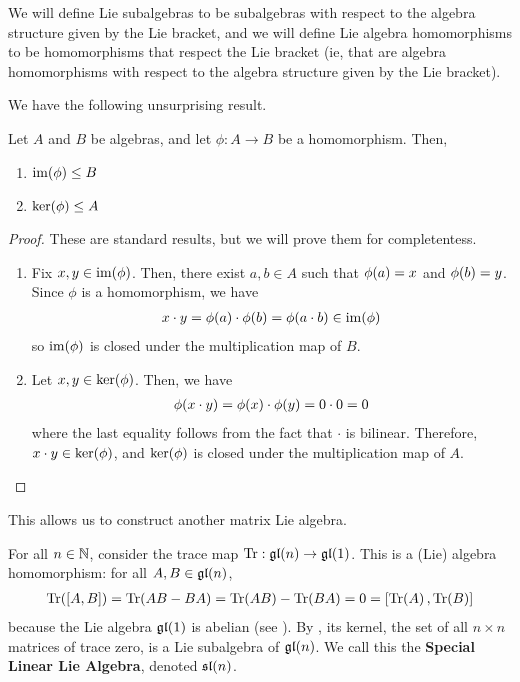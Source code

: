 \begin{boxconvention}
    We will define Lie subalgebras to be subalgebras with respect to the algebra structure given by the Lie bracket, and we will define Lie algebra homomorphisms to be homomorphisms that respect the Lie bracket (ie, that are algebra homomorphisms with respect to the algebra structure given by the Lie bracket).
\end{boxconvention}

We have the following unsurprising result.

\begin{lemma}\label{Ch1:Lemma:im_ker_subalg}
    Let $A$ and $B$ be algebras, and let $\phi: A \to B$ be a homomorphism. Then,
    \begin{enumerate}[label= \normalfont\arabic*., noitemsep]
        \item $\pim{\phi} \leq B$
        \item $\pker{\phi} \leq A$
    \end{enumerate}
\end{lemma}
\begin{proof}
    These are standard results, but we will prove them for completentess.
    \begin{enumerate}
        \item Fix $x, y \in \pim{\phi}$. Then, there exist $a, b \in A$ such that $\phiof{a} = x$ and $\phiof{b} = y$. Since $\phi$ is a homomorphism, we have
        \begin{align*}
            x \cdot y = \phiof{a} \cdot \phiof{b} = \phiof{a \cdot b} \in \pim{\phi}
        \end{align*}
        so $\pim{\phi}$ is closed under the multiplication map of $B$.
        \item Let $x, y \in \pker{\phi}$. Then, we have
        \begin{align*}
            \phiof{x \cdot y} = \phiof{x} \cdot \phiof{y} = 0 \cdot 0 = 0
        \end{align*}
        where the last equality follows from the fact that $\cdot$ is bilinear. Therefore, $x \cdot y \in \pker{\phi}$, and $\pker{\phi}$ is closed under the multiplication map of $A$.
    \end{enumerate}
\end{proof}

This allows us to construct another matrix Lie algebra.

\begin{boxexample}\label{Ch1:Eg:sl}
    For all $n \in \N$, consider the trace map $\operatorname{Tr} : \gl{n} \to \gl{1}$. This is a (Lie) algebra homomorphism: for all $A, B \in \gl{n}$,
    \begin{align*}
        \Tr{\brac{A, B}} = \Tr{AB - BA} = \Tr{AB} - \Tr{BA} = 0 = \brac{\Tr{A}, \Tr{B}}
    \end{align*}
    because the Lie algebra $\gl{1}$ is abelian (see ). By , its kernel, the set of all $n \times n$ matrices of trace zero, is a Lie subalgebra of $\gl{n}$. We call this the \textbf{Special Linear Lie Algebra}, denoted $\sl{n}$.
\end{boxexample}

